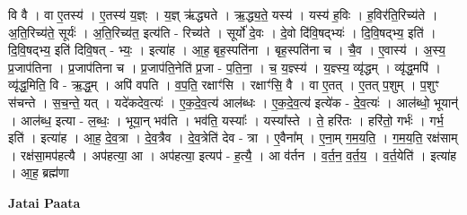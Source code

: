 \documentclass[17pt]{extarticle}
\begin{document}
वि वै । वा ए॒तस्य॑ । ए॒तस्य॑ य॒ज्ञ्ः । य॒ज्ञ् ऋ॑द्ध्यते । ऋ॒द्ध्य॒ते॒ यस्य॑ । यस्य॑ ह॒विः । ह॒विर॑ति॒रिच्य॑ते । अ॒ति॒रिच्य॑ते॒ सूर्यः॑ । अ॒ति॒रिच्य॑त॒ इत्य॑ति - रिच्य॑ते । सूर्यो॑ दे॒वः । दे॒वो दि॑वि॒षद्भ्यः॑ । दि॒वि॒षद्भ्य॒ इति॑ । दि॒वि॒षद्भ्य॒ इति॑ दिवि॒षत् - भ्यः॒ । इत्या॑ह । आ॒ह॒ बृह॒स्पति॑ना । बृह॒स्पति॑ना च । चै॒व । ए॒वास्य॑ । अ॒स्य॒ प्र॒जाप॑तिना । प्र॒जाप॑तिना च । प्र॒जाप॑ति॒नेति॑ प्र॒जा - प॒ति॒ना॒ । च॒ य॒ज्ञ्स्य॑ । य॒ज्ञ्स्य॒ व्यृ॑द्धम् । व्यृ॑द्ध॒मपि॑ । व्यृ॑द्ध॒मिति॒ वि - ऋ॒द्ध॒म् । अपि॑ वपति । व॒प॒ति॒ रक्षाꣳ॑सि । रक्षाꣳ॑सि॒ वै । वा ए॒तत् । ए॒तत् प॒शुम् । प॒शुꣳ स॑चन्ते । स॒च॒न्ते॒ यत् । यदे॑कदेव॒त्यः॑ । ए॒क॒दे॒व॒त्य॑ आल॑ब्धः । ए॒क॒दे॒व॒त्य॑ इत्ये॑क - दे॒व॒त्यः॑ । आल॑ब्धो॒ भूयान्॑ । आल॑ब्ध॒ इत्या - ल॒ब्धः॒ । भूया॒न् भव॑ति । भव॑ति॒ यस्याः᳚ । यस्या᳚स्ते । ते॒ हरि॑तः । हरि॑तो॒ गर्भः॑ । गर्भ॒ इति॑ । इत्या॑ह । आ॒ह॒ दे॒व॒त्रा । दे॒व॒त्रैव । दे॒व॒त्रेति॑ 
देव - त्रा । ए॒वैना᳚म् । ए॒ना॒म् ग॒म॒य॒ति॒ । ग॒म॒य॒ति॒ रक्ष॑साम् । रक्ष॑सा॒मप॑हत्यै । अप॑हत्या॒ आ । अप॑हत्या॒ इत्यप॑ - ह॒त्यै॒ । 
आ व॑र्तन । व॒र्त॒न॒ व॒र्त॒य॒ । व॒र्त॒येति॑ । इत्या॑ह । 
आ॒ह॒ ब्रह्म॑णा \newline

\textbf{Jatai Paata} \newline
\end{document}
